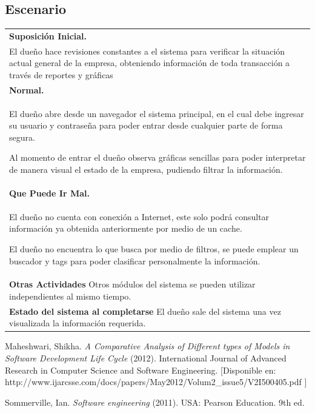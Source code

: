\documentclass[spanish,12pt,letterpapper]{article}
\begin{document}
	\subsection{Escenario}
	\begin{tabular}{|p{10cm}|}
	\hline
	\textbf{Suposición Inicial.}\\
	El dueño hace revisiones constantes a el sistema para verificar la situación actual general de la empresa, obteniendo información de toda transacción a través de reportes y gráficas\\
	\hline
	\textbf{Normal.}\\
	El dueño abre desde un navegador el sistema principal, en el cual debe ingresar su usuario y contraseña para poder entrar desde cualquier parte de forma segura.
	
	Al momento de entrar el dueño observa gráficas sencillas para poder interpretar de manera visual el estado de la empresa, pudiendo filtrar la información.\\
	\hline
	\textbf{Que Puede Ir Mal.}\\
	El dueño no cuenta con conexión a Internet, este solo podrá consultar información ya obtenida anteriormente por medio de un cache.
	
	El dueño no encuentra lo que busca por medio de filtros, se puede emplear un buscador y tags para poder clasificar personalmente la información.\\
	\hline
	\textbf{Otras Actividades}
	Otros módulos del sistema se pueden utilizar independientes al mismo tiempo.\\
	\hline
	\textbf{Estado del sistema al completarse}
	El dueño sale del sistema una vez visualizada la información requerida.\\
	\hline
	\end{tabular}
	
	\pagebreak
	\begin{thebibliography}{9}
	  Maheshwari, Shikha. 
		\emph{A Comparative Analysis of Different types of Models in Software Development Life Cycle} (2012). International Journal of Advanced Research in Computer Science and Software Engineering. [Disponible en: http://www.ijarcsse.com/docs/papers/May2012/Volum2\_issue5/V2I500405.pdf ]
		
		  Sommerville, Ian. 
		\emph{Software engineering} (2011). USA:  Pearson Education. 9th ed. 
		
	\end{thebibliography}
	
\end{document}
